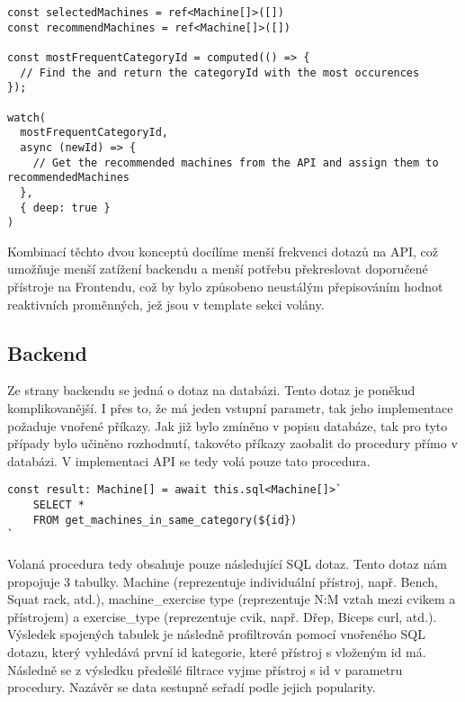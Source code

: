 \begin{lstlisting}
const selectedMachines = ref<Machine[]>([])
const recommendMachines = ref<Machine[]>([])

const mostFrequentCategoryId = computed(() => {
  // Find the and return the categoryId with the most occurences
});

watch(
  mostFrequentCategoryId,
  async (newId) => {
    // Get the recommended machines from the API and assign them to recommendedMachines
  },
  { deep: true }
)
\end{lstlisting}

Kombinací těchto dvou konceptů docílíme menší frekvenci dotazů na API, což umožňuje menší zatížení backendu a menší potřebu překreslovat doporučené přístroje na Frontendu, což by bylo způsobeno neustálým přepisováním hodnot reaktivních proměnných, jež jsou v template sekci volány.

\subsection{Backend}
Ze strany backendu se jedná o dotaz na databázi. Tento dotaz je poněkud komplikovanější. I přes to, že má jeden vstupní parametr, tak jeho implementace požaduje vnořené příkazy. Jak již bylo zmíněno v popisu databáze, tak pro tyto případy bylo učiněno rozhodnutí, takovéto příkazy zaobalit do procedury přímo v databázi. V implementaci API se tedy volá pouze tato procedura.

\begin{lstlisting}
const result: Machine[] = await this.sql<Machine[]>`
    SELECT * 
    FROM get_machines_in_same_category(${id})
`
\end{lstlisting}

Volaná procedura tedy obsahuje pouze následující SQL dotaz. Tento dotaz nám propojuje 3 tabulky. Machine (reprezentuje individuální přístroj, např. Bench, Squat rack, atd.), machine\_exercise type (reprezentuje N:M vztah mezi cvikem a přístrojem) a exercise\_type (reprezentuje cvik, např. Dřep, Biceps curl, atd.). Výsledek spojených tabulek je následně profiltrován pomocí vnořeného SQL dotazu, který vyhledává první id kategorie, které přístroj s vloženým id má. Následně se z výsledku předešlé filtrace vyjme přístroj s id v parametru procedury. Nazávěr se data sestupně seřadí podle jejich popularity.

